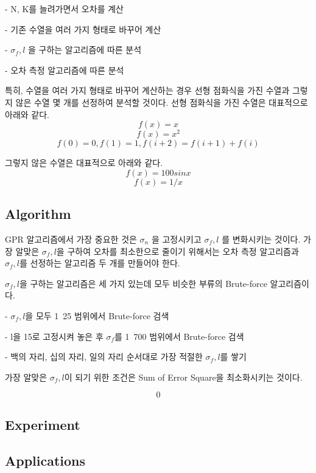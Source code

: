 \documentclass{sig-alternate-05-2015}
\begin{document}
\begin{CJK}{UTF8}{mj}
- N, K를 늘려가면서 오차를 계산

- 기존 수열을 여러 가지 형태로 바꾸어 계산

- $\sigma_f, l$ 을 구하는 알고리즘에 따른 분석

- 오차 측정 알고리즘에 따른 분석

특히, 수열을 여러 가지 형태로 바꾸어 계산하는 경우 선형 점화식을 가진 수열과 그렇지 않은 수열 몇 개를 선정하여 분석할 것이다. 선형 점화식을 가진 수열은 대표적으로 아래와 같다.
\begin{equation} f(x) = x \end{equation}
\begin{equation} f(x) = x^2 \end{equation}
\begin{equation} f(0)=0, f(1)=1, f(i+2)=f(i+1)+f(i) \end{equation}

그렇지 않은 수열은 대표적으로 아래와 같다.
\begin{equation} f(x) = 100 sin{x} \end{equation}
\begin{equation} f(x) = 1/x \end{equation}


\subsection{Algorithm}
GPR 알고리즘에서 가장 중요한 것은 $\sigma_n$ 을 고정시키고 $\sigma_f, l$ 를 변화시키는 것이다. 가장 알맞은 $\sigma_f, l$을 구하여 오차를 최소한으로 줄이기 위해서는 오차 측정 알고리즘과 $\sigma_f, l$를 선정하는 알고리즘 두 개를 만들어야 한다.

$\sigma_f, l$을 구하는 알고리즘은 세 가지 있는데 모두 비슷한 부류의 Brute-force 알고리즘이다.

- $\sigma_f, l$을 모두 1~25 범위에서 Brute-force 검색

- l을 15로 고정시켜 놓은 후  $\sigma_f$를 1~700 범위에서 Brute-force 검색

- 백의 자리, 십의 자리, 일의 자리 순서대로 가장 적절한 $\sigma_f, l$를 쌓기

가장 알맞은 $\sigma_f, l$이 되기 위한 조건은 Sum of Error Square을 최소화시키는 것이다.

\begin{equation} 0 \end{equation}

\subsection{Experiment}
\subsection{Applications}
\end{CJK}
\end{document}
